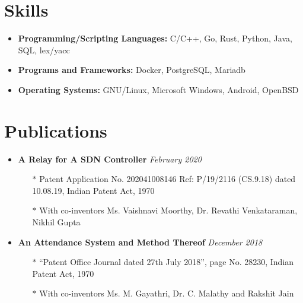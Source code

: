 \documentclass[10pt,a4paper]{article}
\begin{document}
\section{{\faCogs} Skills}
	\begin{itemize}[noitemsep,nolistsep]
		\item\textbf{Programming/Scripting Languages:} C/C++, Go, Rust, Python, Java, SQL, lex/yacc
		\item\textbf{Programs and Frameworks:} Docker, PostgreSQL, Mariadb
		\item\textbf{Operating Systems:} GNU/Linux, Microsoft Windows, Android, OpenBSD
	\end{itemize}


\section{{\faNewspaperO} Publications}
	\begin{itemize}[noitemsep,nolistsep]
		\item{\textbf{A Relay for A SDN Controller}} \hfill \textit{February 2020}
			\begin{itemize}[leftmargin=*]
				\setlength\itemsep{-0.25em}
				\item[$\ast$]Patent Application No. 202041008146 Ref: P/19/2116 (CS.9.18) dated 10.08.19, Indian Patent Act, 1970
				\item[$\ast$]With co-inventors Ms. Vaishnavi Moorthy, Dr. Revathi Venkataraman, Nikhil Gupta
			\end{itemize}
		\item{\textbf{An Attendance System and Method Thereof}} \hfill \textit{December 2018}
			\begin{itemize}[leftmargin=*]
				\setlength\itemsep{-0.25em}
				\item[$\ast$]``Patent Office Journal dated 27th July 2018'', page No. 28230, Indian Patent Act, 1970
				\item[$\ast$]With co-inventors Ms. M. Gayathri, Dr. C. Malathy and Rakshit Jain
			\end{itemize}
	\end{itemize}
\end{document}
